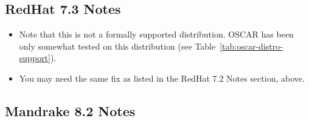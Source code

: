 
\subsection{RedHat 7.3 Notes}
\label{subsec:rh73notes}

\begin{itemize}
\item Note that this is not a formally supported distribution.  OSCAR
  \oscarversion\- has been only somewhat tested on this distribution
  (see Table~\ref{tab:oscar-distro-support}).

\item You may need the same  fix as listed
  in the RedHat 7.2 Notes section, above.
\end{itemize}


\subsection{Mandrake 8.2 Notes}
\label{subsec:mdk82notes}

